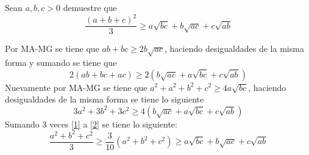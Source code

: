 \documentclass{ayudantia}
\begin{document}
\begin{prob}
    Sean \(a,b,c>0\) demuestre que
    \begin{equation*}
        \frac{(a+b+c)^2}3\geq a\sqrt{bc}+b\sqrt{ac}+c\sqrt{ab}
    \end{equation*}
\end{prob}

\begin{ans}
    \begin{sol}
        Por MA-MG se tiene que \(ab+bc\geq2b\sqrt{ac}\), haciendo desigualdades de la misma forma y sumando se tiene que
        \begin{equation}\label{1}
            2(ab+bc+ac)\geq2(b\sqrt{ac}+a\sqrt{bc}+c\sqrt{ab})
        \end{equation}
        Nuevamente por MA-MG se tiene que \(a^2+a^2+b^2+c^2\geq4a\sqrt{bc}\), haciendo desigualdades de la misma forma se tiene lo siguiente
        \begin{equation}\label{2}
            3a^2+3b^2+3c^2\geq4(b\sqrt{ac}+a\sqrt{bc}+c\sqrt{ab})
        \end{equation}
        Sumando \(3\) veces \eqref{1} a \eqref{2} se tiene lo siguiente:
        \begin{equation*}
            \frac{a^2+b^2+c^2}3\geq\frac3{10}(a^2+b^2+c^2)\geq a\sqrt{bc}+b\sqrt{ac}+c\sqrt{ab}
        \end{equation*}
    \end{sol}
\end{ans}
\end{document}
